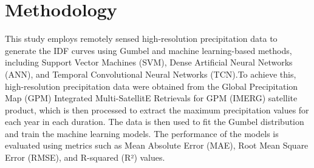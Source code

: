 \section{Methodology}

This study employs remotely sensed high-resolution precipitation data to generate the IDF curves using Gumbel and machine learning-based methods, including Support Vector Machines (SVM), Dense Artificial Neural Networks (ANN), and Temporal Convolutional Neural Networks (TCN).To achieve this, high-resolution precipitation data were obtained from the Global Precipitation Map (GPM) Integrated Multi-SatellitE Retrievals for GPM (IMERG) satellite product, which is then processed to extract the maximum precipitation values for each year in each duration. The data is then used to fit the Gumbel distribution and train the machine learning models. The performance of the models is evaluated using metrics such as Mean Absolute Error (MAE), Root Mean Square Error (RMSE), and R-squared (R²) values.

